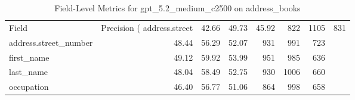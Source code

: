 \begin{table}
\caption{Field-Level Metrics for gpt_5.2_medium_c2500 on address_books}
\label{tab:fields_gpt_5.2_medium_c2500_address_books}
\begin{tabular}{lrrrrrr}
\toprule
Field & Precision (%
\midrule
address.street & 42.66 & 49.73 & 45.92 & 822 & 1105 & 831 \\
address.street_number & 48.44 & 56.29 & 52.07 & 931 & 991 & 723 \\
first_name & 49.12 & 59.92 & 53.99 & 951 & 985 & 636 \\
last_name & 48.04 & 58.49 & 52.75 & 930 & 1006 & 660 \\
occupation & 46.40 & 56.77 & 51.06 & 864 & 998 & 658 \\
\bottomrule
\end{tabular}
\end{table}
